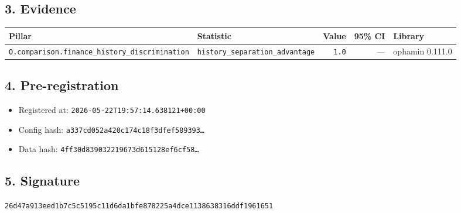 \documentclass{article}
\begin{document}
\subsection*{3. Evidence}
\begin{tabular}{llrrl}\toprule
\textbf{Pillar} & \textbf{Statistic} & \textbf{Value} & \textbf{95\% CI} & \textbf{Library} \\\midrule
\texttt{O.comparison.finance\_history\_discrimination} & \texttt{history\_separation\_advantage} & \texttt{1.0} & --- & ophamin 0.111.0 \\
\bottomrule\end{tabular}
\subsection*{4. Pre-registration}
\begin{itemize}
\item Registered at: \texttt{2026-05-22T19:57:14.638121+00:00}
\item Config hash: \texttt{a337cd052a420c174c18f3dfef589393\dots}
\item Data hash: \texttt{4ff30d839032219673d615128ef6cf58\dots}
\end{itemize}
\subsection*{5. Signature}
\texttt{26d47a913eed1b7c5c5195c11d6da1bfe878225a4dce1138638316ddf1961651}\\
\end{document}
